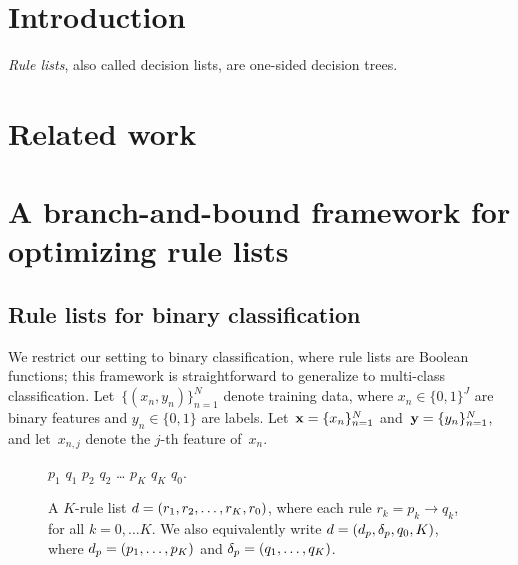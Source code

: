\section{Introduction}

\emph{Rule lists}, also called decision lists, are one-sided decision trees.

\section{Related work}

\citep{rivest:1987}

\citep{LethamRuMcMa15}

\citep{YangRuSe16}

\citep{garofalakis:2000-kdd,garofalakis:2000-sigkdd,garofalakis:2003}

\section{A branch-and-bound framework for optimizing rule lists}

\subsection{Rule lists for binary classification}
\label{sec:setup}

We restrict our setting to binary classification,
where rule lists are Boolean functions;
this framework is straightforward to generalize to multi-class classification.
%
Let~${\{(x_n, y_n)\}_{n=1}^N}$ denote training data,
where ${x_n \in \{0, 1\}^J}$ are binary features and ${y_n \in \{0, 1\}}$ are labels.
%
Let~${\mathbf{x} = \{x_n\}_{n=1}^N}$ and~${\mathbf{y} = \{y_n\}_{n=1}^N}$,
and let~${x_{n,j}}$ denote the $j$-th feature of~$x_n$.

\begin{figure}[b!]
\begin{algorithmic}
\normalsize
\State \bif $p_1$ \bthen $q_1$
\State \belif $p_2$ \bthen $q_2$
\State \dots
\State \belif $p_K$ \bthen $q_K$
\State \belse $q_0$.
\end{algorithmic}
\caption{A $K$-rule list ${{d} = (r_1, r_2, \dots, r_K, r_0)}$, where
each rule ${r_k = p_k \rightarrow q_k}$, for all ${k = 0, \dots K}$.
We also equivalently write ${{d} = (d_p, \delta_p, q_0, K)}$,
where ${d_p = (p_1, \dots, p_K)}$
and ${\delta_p = (q_1, \dots, q_K)}$.}
\label{fig:rule-list}
\end{figure}

